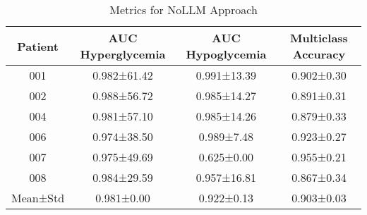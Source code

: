 \begin{table}[h!]
\centering
\caption{Metrics for NoLLM Approach}
\label{tab:metrics_NoLLM}
\renewcommand{\arraystretch}{1.2}
\begin{tabular}{|c|c|c|c|}
\hline
\rowcolor{gray!20} \textbf{Patient} & \textbf{AUC Hyperglycemia} & \textbf{AUC Hypoglycemia} & \textbf{Multiclass Accuracy} \\
\hline
001 & 0.982±61.42 & 0.991±13.39 & 0.902±0.30 \\
\hline
002 & 0.988±56.72 & 0.985±14.27 & 0.891±0.31 \\
\hline
004 & 0.981±57.10 & 0.985±14.26 & 0.879±0.33 \\
\hline
006 & 0.974±38.50 & 0.989±7.48 & 0.923±0.27 \\
\hline
007 & 0.975±49.69 & 0.625±0.00 & 0.955±0.21 \\
\hline
008 & 0.984±29.59 & 0.957±16.81 & 0.867±0.34 \\
\hline
Mean±Std & 0.981±0.00 & 0.922±0.13 & 0.903±0.03 \\
\hline
\end{tabular}
\end{table}